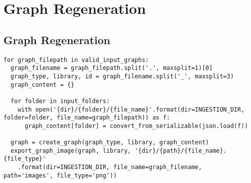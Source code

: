 \chapter[Graph Regeneration]{Graph Regeneration}
\label{AppendixC}

\lstset{
basicstyle=\small\ttfamily,
columns=flexible,
breaklines=true
}

\section{Graph Regeneration}
\begin{lstlisting}
for graph_filepath in valid_input_graphs:
  graph_filename = graph_filepath.split('.', maxsplit=1)[0]
  graph_type, library, id = graph_filename.split('_', maxsplit=3)
  graph_content = {}
  
  for folder in input_folders:
    with open('{dir}/{folder}/{file_name}'.format(dir=INGESTION_DIR, folder=folder, file_name=graph_filepath)) as f:
      graph_content[folder] = convert_from_serializable(json.load(f))
  
  graph = create_graph(graph_type, library, graph_content)
  export_graph_image(graph, library, '{dir}/{path}/{file_name}.{file_type}'
    .format(dir=INGESTION_DIR, file_name=graph_filename, path='images', file_type='png'))
\end{lstlisting}